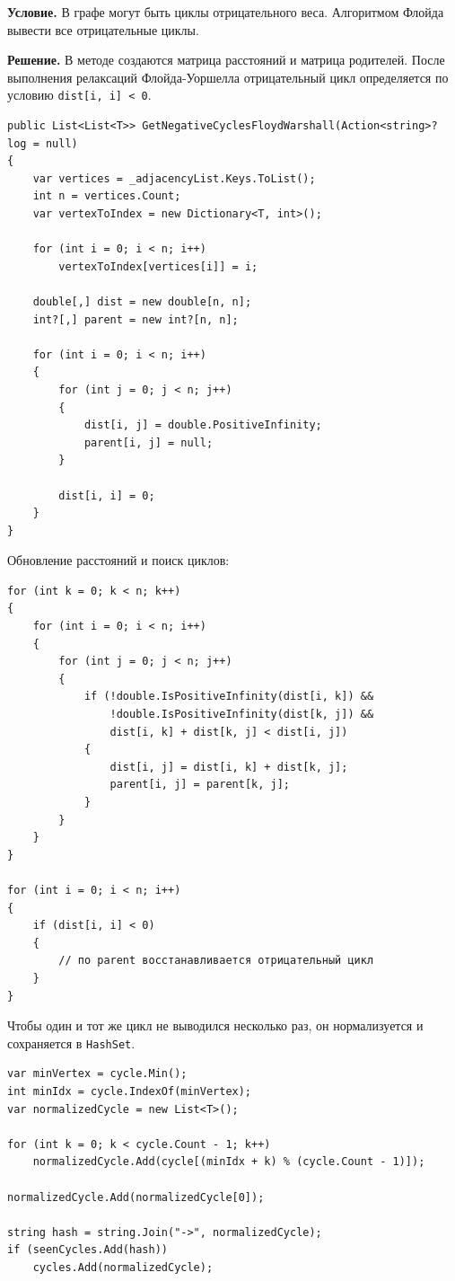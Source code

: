 \documentclass[pract]{SCWorks}
\newcommand{\smalltt}[1]{{\footnotesize\texttt{#1}}}
\begin{document}
    \textbf{Условие.}
    В графе могут быть циклы отрицательного веса.
    Алгоритмом Флойда вывести все отрицательные циклы.

    \textbf{Решение.}
    В методе создаются матрица расстояний и матрица родителей.
    После выполнения релаксаций Флойда-Уоршелла отрицательный цикл определяется по условию \smalltt{dist[i, i] < 0}.

    \begin{verbatim}
public List<List<T>> GetNegativeCyclesFloydWarshall(Action<string>? log = null)
{
    var vertices = _adjacencyList.Keys.ToList();
    int n = vertices.Count;
    var vertexToIndex = new Dictionary<T, int>();

    for (int i = 0; i < n; i++)
        vertexToIndex[vertices[i]] = i;

    double[,] dist = new double[n, n];
    int?[,] parent = new int?[n, n];

    for (int i = 0; i < n; i++)
    {
        for (int j = 0; j < n; j++)
        {
            dist[i, j] = double.PositiveInfinity;
            parent[i, j] = null;
        }

        dist[i, i] = 0;
    }
}
    \end{verbatim}

    Обновление расстояний и поиск циклов:

    \begin{verbatim}
for (int k = 0; k < n; k++)
{
    for (int i = 0; i < n; i++)
    {
        for (int j = 0; j < n; j++)
        {
            if (!double.IsPositiveInfinity(dist[i, k]) &&
                !double.IsPositiveInfinity(dist[k, j]) &&
                dist[i, k] + dist[k, j] < dist[i, j])
            {
                dist[i, j] = dist[i, k] + dist[k, j];
                parent[i, j] = parent[k, j];
            }
        }
    }
}

for (int i = 0; i < n; i++)
{
    if (dist[i, i] < 0)
    {
        // по parent восстанавливается отрицательный цикл
    }
}
    \end{verbatim}

    Чтобы один и тот же цикл не выводился несколько раз, он нормализуется и сохраняется в \smalltt{HashSet}.

    \begin{verbatim}
var minVertex = cycle.Min();
int minIdx = cycle.IndexOf(minVertex);
var normalizedCycle = new List<T>();

for (int k = 0; k < cycle.Count - 1; k++)
    normalizedCycle.Add(cycle[(minIdx + k) % (cycle.Count - 1)]);

normalizedCycle.Add(normalizedCycle[0]);

string hash = string.Join("->", normalizedCycle);
if (seenCycles.Add(hash))
    cycles.Add(normalizedCycle);
    \end{verbatim}
\end{document}

